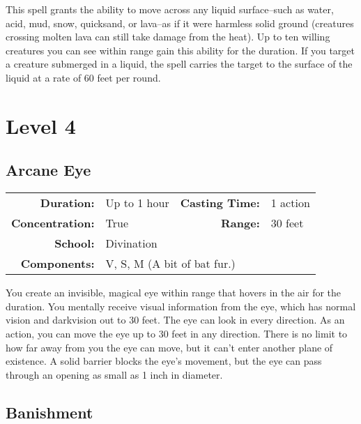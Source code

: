 \documentclass[a5paper, 12pt]{memoir}
\begin{document}
\vspace{1\baselineskip}\noindent This spell grants the ability to move across any liquid surface--such as water, acid, mud, snow, quicksand, or lava--as if it were harmless solid ground (creatures crossing molten lava can still take damage from the heat). Up to ten willing creatures you can see within range gain this ability for the duration. If you target a creature submerged in a liquid, the spell carries the target to the surface of the liquid at a rate of 60 feet per round.

\newpage
\chapter*{Level 4} 
\section*{Arcane Eye}

{
\small\centering\vspace{-6pt}
\begin{tabular}{rlrl}
\toprule

\textbf{Duration:} & Up to 1 hour &
\textbf{Casting Time:} & 1 action \\
\textbf{Concentration:} & True &
\textbf{Range:} & 30 feet \\
\textbf{School:} & Divination \\
\textbf{Components:} & \multicolumn{3}{p{0.7\textwidth}}{V, S, M (A bit of bat fur.)}\\

\bottomrule
\end{tabular}
}

\vspace{1\baselineskip}\noindent You create an invisible, magical eye within range that hovers in the air for the duration. You mentally receive visual information from the eye, which has normal vision and darkvision out to 30 feet. The eye can look in every direction. As an action, you can move the eye up to 30 feet in any direction. There is no limit to how far away from you the eye can move, but it can't enter another plane of existence. A solid barrier blocks the eye's movement, but the eye can pass through an opening as small as 1 inch in diameter.

\newpage
\section*{Banishment}
\end{document}
